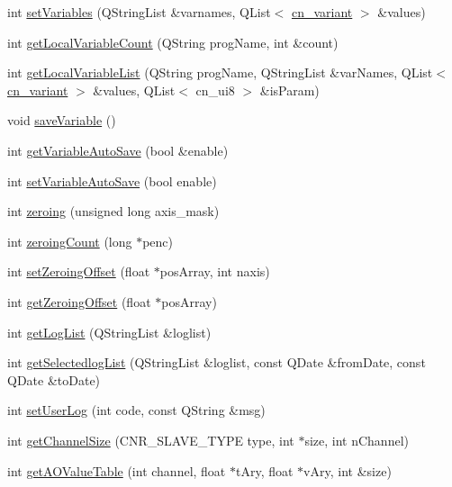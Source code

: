 \begin{DoxyCompactItemize}
\item 
int \hyperlink{classCNRobo_acb2ea7b47ffbc349f788eb4ffc0ee596}{set\-Variables} (Q\-String\-List \&varnames, Q\-List$<$ \hyperlink{structcn__variant}{cn\-\_\-variant} $>$ \&values)
\item 
int \hyperlink{classCNRobo_ae4d9215ab8b5deb1c2a95d387eec60b4}{get\-Local\-Variable\-Count} (Q\-String prog\-Name, int \&count)
\item 
int \hyperlink{classCNRobo_a7ce4f2a6caa212b054e4402ffd777b2c}{get\-Local\-Variable\-List} (Q\-String prog\-Name, Q\-String\-List \&var\-Names, Q\-List$<$ \hyperlink{structcn__variant}{cn\-\_\-variant} $>$ \&values, Q\-List$<$ cn\-\_\-ui8 $>$ \&is\-Param)
\item 
void \hyperlink{classCNRobo_ae0dbe2e97f90d693fad0326f41774227}{save\-Variable} ()
\item 
int \hyperlink{classCNRobo_a5625e247eaba2ca2fea1d57b0ea66141}{get\-Variable\-Auto\-Save} (bool \&enable)
\item 
int \hyperlink{classCNRobo_a28e2ac7fc1a7c7034afc5d0e348850d8}{set\-Variable\-Auto\-Save} (bool enable)
\item 
int \hyperlink{classCNRobo_add70ad17aea1f65e7d44de4af3627457}{zeroing} (unsigned long axis\-\_\-mask)
\item 
int \hyperlink{classCNRobo_a6403dc94372721ac2c8959242173950a}{zeroing\-Count} (long $\ast$penc)
\item 
int \hyperlink{classCNRobo_a788772d9ebd8406480a046e1b0905563}{set\-Zeroing\-Offset} (float $\ast$pos\-Array, int naxis)
\item 
int \hyperlink{classCNRobo_a554705040e4c993c3099fe3fdf87dd75}{get\-Zeroing\-Offset} (float $\ast$pos\-Array)
\item 
int \hyperlink{classCNRobo_a1fc4c67b4c292139596af4a3b210734c}{get\-Log\-List} (Q\-String\-List \&loglist)
\item 
int \hyperlink{classCNRobo_ada276f22cdf38015e1f0265e7a84005d}{get\-Selectedlog\-List} (Q\-String\-List \&loglist, const Q\-Date \&from\-Date, const Q\-Date \&to\-Date)
\item 
int \hyperlink{classCNRobo_a05ed02ac5df4e28b3fd2a00b88d103f0}{set\-User\-Log} (int code, const Q\-String \&msg)
\item 
int \hyperlink{classCNRobo_a51818c52f8b6ba82a589fe597f278ec7}{get\-Channel\-Size} (C\-N\-R\-\_\-\-S\-L\-A\-V\-E\-\_\-\-T\-Y\-P\-E type, int $\ast$size, int n\-Channel)
\item 
int \hyperlink{classCNRobo_a92dd8db99e2b27571e4a9275bafdc127}{get\-A\-O\-Value\-Table} (int channel, float $\ast$t\-Ary, float $\ast$v\-Ary, int \&size)

\end{DoxyCompactItemize}
